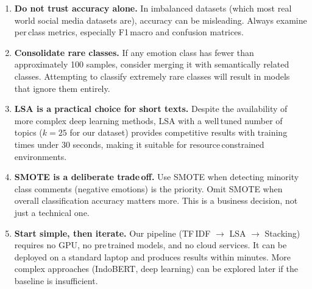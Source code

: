 \documentclass[12pt,a4paper,twoside]{article}
\theoremstyle{definition}
\begin{document}
\begin{enumerate}[leftmargin=2em]
    \item \textbf{Do not trust accuracy alone.} In imbalanced datasets (which most real world social media datasets are), accuracy can be misleading. Always examine per\,class metrics, especially F1\,macro and confusion matrices.
 
    \item \textbf{Consolidate rare classes.} If any emotion class has fewer than approximately 100 samples, consider merging it with semantically related classes. Attempting to classify extremely rare classes will result in models that ignore them entirely.
 
    \item \textbf{LSA is a practical choice for short texts.} Despite the availability of more complex deep learning methods, LSA with a well\,tuned number of topics ($k=25$ for our dataset) provides competitive results with training times under 30 seconds, making it suitable for resource\,constrained environments.
 
    \item \textbf{SMOTE is a deliberate trade\,off.} Use SMOTE when detecting minority class comments (negative emotions) is the priority. Omit SMOTE when overall classification accuracy matters more. This is a business decision, not just a technical one.
 
    \item \textbf{Start simple, then iterate.} Our pipeline (TF\,IDF $\to$ LSA $\to$ Stacking) requires no GPU, no pre\,trained models, and no cloud services. It can be deployed on a standard laptop and produces results within minutes. More complex approaches (IndoBERT, deep learning) can be explored later if the baseline is insufficient.
\end{enumerate}

\newpage

\end{document}
